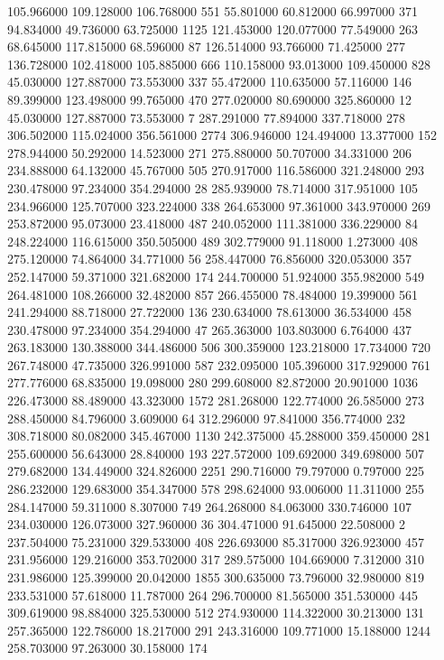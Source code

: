 105.966000	109.128000	106.768000	551
55.801000	60.812000	66.997000	371
94.834000	49.736000	63.725000	1125
121.453000	120.077000	77.549000	263
68.645000	117.815000	68.596000	87
126.514000	93.766000	71.425000	277
136.728000	102.418000	105.885000	666
110.158000	93.013000	109.450000	828
45.030000	127.887000	73.553000	337
55.472000	110.635000	57.116000	146
89.399000	123.498000	99.765000	470
277.020000	80.690000	325.860000	12
45.030000	127.887000	73.553000	7
287.291000	77.894000	337.718000	278
306.502000	115.024000	356.561000	2774
306.946000	124.494000	13.377000	152
278.944000	50.292000	14.523000	271
275.880000	50.707000	34.331000	206
234.888000	64.132000	45.767000	505
270.917000	116.586000	321.248000	293
230.478000	97.234000	354.294000	28
285.939000	78.714000	317.951000	105
234.966000	125.707000	323.224000	338
264.653000	97.361000	343.970000	269
253.872000	95.073000	23.418000	487
240.052000	111.381000	336.229000	84
248.224000	116.615000	350.505000	489
302.779000	91.118000	1.273000	408
275.120000	74.864000	34.771000	56
258.447000	76.856000	320.053000	357
252.147000	59.371000	321.682000	174
244.700000	51.924000	355.982000	549
264.481000	108.266000	32.482000	857
266.455000	78.484000	19.399000	561
241.294000	88.718000	27.722000	136
230.634000	78.613000	36.534000	458
230.478000	97.234000	354.294000	47
265.363000	103.803000	6.764000	437
263.183000	130.388000	344.486000	506
300.359000	123.218000	17.734000	720
267.748000	47.735000	326.991000	587
232.095000	105.396000	317.929000	761
277.776000	68.835000	19.098000	280
299.608000	82.872000	20.901000	1036
226.473000	88.489000	43.323000	1572
281.268000	122.774000	26.585000	273
288.450000	84.796000	3.609000	64
312.296000	97.841000	356.774000	232
308.718000	80.082000	345.467000	1130
242.375000	45.288000	359.450000	281
255.600000	56.643000	28.840000	193
227.572000	109.692000	349.698000	507
279.682000	134.449000	324.826000	2251
290.716000	79.797000	0.797000	225
286.232000	129.683000	354.347000	578
298.624000	93.006000	11.311000	255
284.147000	59.311000	8.307000	749
264.268000	84.063000	330.746000	107
234.030000	126.073000	327.960000	36
304.471000	91.645000	22.508000	2
237.504000	75.231000	329.533000	408
226.693000	85.317000	326.923000	457
231.956000	129.216000	353.702000	317
289.575000	104.669000	7.312000	310
231.986000	125.399000	20.042000	1855
300.635000	73.796000	32.980000	819
233.531000	57.618000	11.787000	264
296.700000	81.565000	351.530000	445
309.619000	98.884000	325.530000	512
274.930000	114.322000	30.213000	131
257.365000	122.786000	18.217000	291
243.316000	109.771000	15.188000	1244
258.703000	97.263000	30.158000	174

